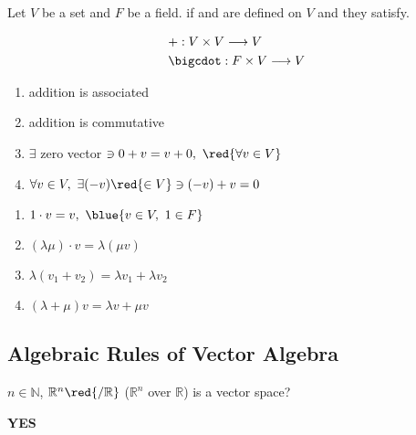 \newpage

\begin{definition}
    Let $V$ be a set and $F$ be a field.  if  and  are defined on $V$ and they satisfy.

    \begin{align*}
        &+ : V \times V \longrightarrow V \\
        &\bigcdot : F \times V \longrightarrow V
    \end{align*}

    \begin{enumerate}[label=(A\arabic*)]
        \item addition is associated
        \item addition is commutative
        \item $\exists$ zero vector  $\ni 0 + v = v + 0, \ \red{\forall v \in V}$ 
        \item $\forall v \in V, \ \exists (-v) \red{\in V} \ni (-v) + v = 0$
   \end{enumerate}
   \begin{enumerate}[label=(M\arabic*)]
        \item $1\cdot v = v, \ \blue{v\in V, \ 1 \in F}$
        \item $(\lambda \mu) \cdot v = \lambda (\mu v)$ 
        \item $\lambda(v_1 + v_2) = \lambda v_1 + \lambda v_2$ 
        \item $(\lambda + \mu) v = \lambda v + \mu v$ 
   \end{enumerate}
\end{definition}

\subsection{Algebraic Rules of Vector Algebra}

\begin{exercise}
    $n \in \mathbb{N}$, $\mathbb{R}^n\red{/\mathbb{R}}$ ($\mathbb{R}^n$ over $\mathbb{R}$) is a vector space?
\end{exercise}
\begin{answer}
    \textbf{YES}
\end{answer}


